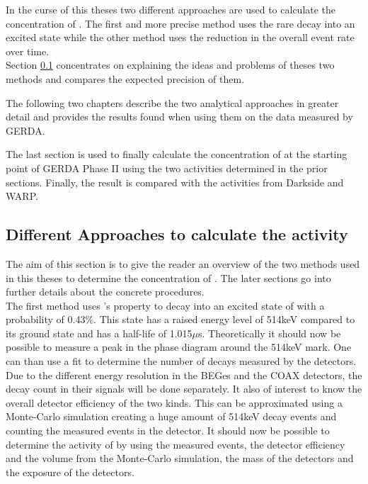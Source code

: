 In the curse of this theses two different approaches are used to calculate the concentration of . 
The first and more precise method uses the rare  decay into an excited state while the other method uses the reduction in the overall event rate over time.\\

Section \ref{sec:Appro} concentrates on explaining the ideas and problems of theses two methods and compares the expected precision of them. 

The following two chapters describe the two analytical approaches in greater detail and provides the results found when using them on the data measured by GERDA.

The last section is used to finally calculate the concentration of  at the starting point of GERDA Phase II using the two activities determined in the prior sections. 
Finally, the result is compared with the activities from Darkside and WARP. 


\subsection{Different Approaches to calculate the activity}
\label{sec:Appro}

The aim of this section is to give the reader an overview of the two methods used in this theses to determine the concentration of . 
The later sections go into further details about the concrete procedures.
\\

The first method uses 's property to decay into an excited state of  with a probability of 0.43\%. 
This state has a raised energy level of 514keV compared to its ground state and has a half-life of 1.015\(\mu\)s. 
Theoretically it should now be possible to measure a peak in the phase diagram around the 514keV mark. 
One can than use a fit to determine the number of decays measured by the detectors. 
Due to the different energy resolution in the BEGes and the COAX detectors, the decay count in their signals will be done separately. 
It also of interest to know the overall detector efficiency of the two kinds. 
This can be approximated using a Monte-Carlo simulation creating a huge amount of 514keV decay events and counting the measured events in the detector. 
It should now be possible to determine the activity of  by using the measured events, the detector efficiency and the volume from the Monte-Carlo simulation, the mass of the detectors and the exposure of the detectors.
\\


